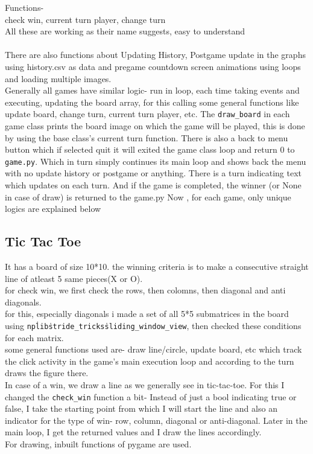 \documentclass[12pt]{article}
\begin{document}
Functions- \\
check win, current turn player, change turn\\

All these are working as their name suggests, easy to understand\\
\\
There are also functions about Updating History, Postgame update in the graphs using history.csv as data and pregame countdown screen animations using loops and loading multiple images.\\
Generally all games have similar logic- run in loop, each time taking events and executing, updating the board array, for this calling some general functions like update board, change turn, current turn player, etc.
The \texttt{draw\_board} in each game class prints the board image on which the game will be played, this is done by using the base class's current turn function.
There is also a back to menu button which if selected quit it will exited the game class loop and return 0 to \texttt{game.py}. Which in turn simply continues its main loop and shows back the menu with no update history or postgame or anything.
There is a turn indicating text which updates on each turn. And if the game is completed, the winner (or None in case of draw) is returned to the game.py 
Now , for each game, only unique logics are explained below
\subsection{Tic Tac Toe}
It has a board of size 10*10. the winning criteria is to make a consecutive straight line of atleast 5 same pieces(X or O).\\
for check win, we first check the rows, then colomns, then diagonal and anti diagonals.\\
for this, especially diagonals i made a set of all 5*5 submatrices in the board using \texttt{np\.lib\.stride\_tricks\.sliding\_window\_view}, then checked these conditions for each matrix.\\
some general functions used are- draw line/circle, update board, etc which track the click activity in the game's main execution loop and according to the turn draws the figure there.\\
In case of a win, we draw a line as we generally see in tic-tac-toe.
For this I changed the \texttt{check\_win} function a bit- Instead of just a bool indicating true or false, I take the starting point from which I will start the line and also an indicator for the type of win- row, column, diagonal or anti-diagonal. Later in the main loop, I get the returned values and I draw the lines accordingly.\\
For drawing, inbuilt functions of pygame are used.\\
\end{document}
